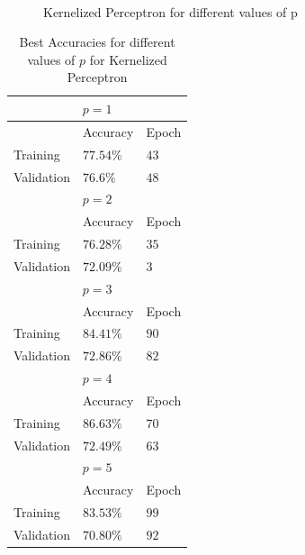 \documentclass{article}
\begin{document}
\begin{figure}[H]
    \\
    \caption{Kernelized Perceptron for different values of p}
    \label{fig:Kernalized_perceptron}%
\end{figure}



\begin{table}
\caption{Best Accuracies for different values of $p$ for Kernelized Perceptron}
\begin{tabular}{ |p{4cm}||p{4cm}||p{4cm}|  }
 \hline  
 \multicolumn{3}{|c|}{$p=1$} \\
 \hline
  & Accuracy & Epoch\\
 \hline
Training & $77.54\%$ & $43$\\
Validation & $76.6\%$ & $48$\\
\hline 
 \multicolumn{3}{|c|}{$p=2$} \\
 \hline
  & Accuracy & Epoch\\
 \hline
Training & $76.28\%$ & $35$\\
Validation & $72.09\%$ & $3$\\
\hline 
 \multicolumn{3}{|c|}{$p=3$} \\
 \hline
  & Accuracy & Epoch\\
 \hline
Training & $84.41\%$ & $90$\\
Validation & $72.86\%$ & $82$\\
\hline 
 \multicolumn{3}{|c|}{$p=4$} \\
 \hline
  & Accuracy & Epoch\\
 \hline
Training & $86.63\%$ & $70$\\
Validation & $72.49\%$ & $63$\\
\hline 
 \multicolumn{3}{|c|}{$p=5$} \\
 \hline
  & Accuracy & Epoch\\
 \hline
Training & $83.53\%$ & $99$\\
Validation & $70.80\%$ & $92$\\
 \hline
\end{tabular}
\label{table:Accuracy}
\end{table}
\vspace{\baselineskip}
\end{document}
